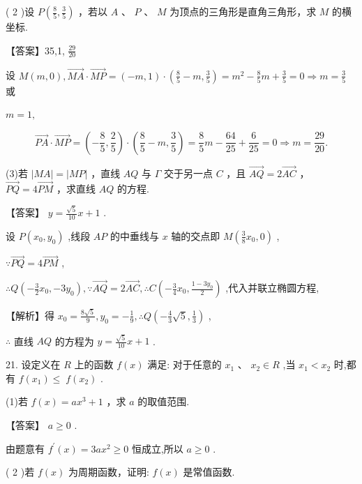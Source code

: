 \documentclass[10pt]{article}
\begin{document}
( 2 )设 \(P\left( {\frac{8}{5},\frac{3}{5}}\right)\) ，若以 \(A\) 、 \(P\) 、 \(M\) 为顶点的三角形是直角三角形，求 \(M\) 的横坐标.

【答案】35,1, \(\frac{29}{20}\)

设 \(M\left( {m,0}\right) ,\overrightarrow{MA} \cdot  \overrightarrow{MP} = \left( {-m,1}\right)  \cdot  \left( {\frac{8}{5} - m,\frac{3}{5}}\right)  = {m}^{2} - \frac{8}{5}m + \frac{3}{5} = 0 \Rightarrow  m = \frac{3}{5}\) 或

\(m = 1,\)

\[
\overrightarrow{PA} \cdot  \overrightarrow{MP} = \left( {-\frac{8}{5},\frac{2}{5}}\right)  \cdot  \left( {\frac{8}{5} - m,\frac{3}{5}}\right)  = \frac{8}{5}m - \frac{64}{25} + \frac{6}{25} = 0 \Rightarrow  m = \frac{29}{20}.
\]

(3)若 \(\left| {MA}\right|  = \left| {MP}\right|\) ，直线 \({AQ}\) 与 \(\Gamma\) 交于另一点 \(C\) ，且 \(\overrightarrow{AQ} = 2\overrightarrow{AC}\) ， \(\overrightarrow{PQ} = 4\overrightarrow{PM}\) ，求直线 \({AQ}\) 的方程.

【答案】 \(y = \frac{\sqrt{5}}{10}x + 1\) .

设 \(P\left( {{x}_{0},{y}_{0}}\right)\) ,线段 \({AP}\) 的中垂线与 \(x\) 轴的交点即 \(M\left( {\frac{3}{8}{x}_{0},0}\right)\) ,

\(\because \overrightarrow{PQ} = 4\overrightarrow{PM}\) ,

\(\therefore Q\left( {-\frac{3}{2}{x}_{0}, - 3{y}_{0}}\right) ,\because \overrightarrow{AQ} = 2\overrightarrow{AC},\therefore C\left( {-\frac{3}{4}{x}_{0},\frac{1 - 3{y}_{0}}{2}}\right)\) ,代入并联立椭圆方程,

【解析】得 \({x}_{0} = \frac{8\sqrt{5}}{9},{y}_{0} =  - \frac{1}{9},\therefore Q\left( {-\frac{4}{3}\sqrt{5},\frac{1}{3}}\right)\) ,

\(\therefore\) 直线 \({AQ}\) 的方程为 \(y = \frac{\sqrt{5}}{10}x + 1\) .

21. 设定义在 \(R\) 上的函数 \(f\left( x\right)\) 满足: 对于任意的 \({x}_{1}\text{ 、 }{x}_{2} \in  R\) ,当 \({x}_{1} < {x}_{2}\) 时,都有 \(f\left( {x}_{1}\right)  \leq \; f\left( {x}_{2}\right)\) .

(1)若 \(f\left( x\right)  = a{x}^{3} + 1\) ，求 \(a\) 的取值范围.

【答案】 \(a \geq  0\) .

由题意有 \({f}^{\prime }\left( x\right)  = {3a}{x}^{2} \geq  0\) 恒成立,所以 \(a \geq  0\) .

( 2 )若 \(f\left( x\right)\) 为周期函数，证明: \(f\left( x\right)\) 是常值函数.
\end{document}

